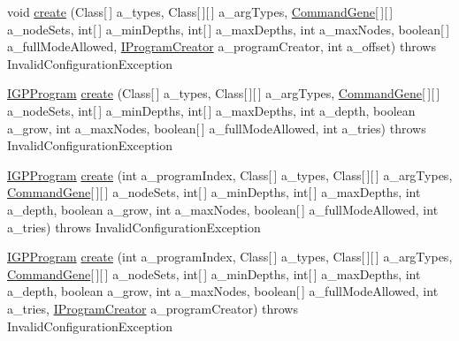 \begin{DoxyCompactItemize}
\item 
void \hyperlink{classorg_1_1jgap_1_1gp_1_1impl_1_1_g_p_population_a21670302d6d9c5ad4bdc2903797eabff}{create} (Class\mbox{[}$\,$\mbox{]} a\-\_\-types, Class\mbox{[}$\,$\mbox{]}\mbox{[}$\,$\mbox{]} a\-\_\-arg\-Types, \hyperlink{classorg_1_1jgap_1_1gp_1_1_command_gene}{Command\-Gene}\mbox{[}$\,$\mbox{]}\mbox{[}$\,$\mbox{]} a\-\_\-node\-Sets, int\mbox{[}$\,$\mbox{]} a\-\_\-min\-Depths, int\mbox{[}$\,$\mbox{]} a\-\_\-max\-Depths, int a\-\_\-max\-Nodes, boolean\mbox{[}$\,$\mbox{]} a\-\_\-full\-Mode\-Allowed, \hyperlink{interfaceorg_1_1jgap_1_1gp_1_1_i_program_creator}{I\-Program\-Creator} a\-\_\-program\-Creator, int a\-\_\-offset)  throws Invalid\-Configuration\-Exception 
\item 
\hyperlink{interfaceorg_1_1jgap_1_1gp_1_1_i_g_p_program}{I\-G\-P\-Program} \hyperlink{classorg_1_1jgap_1_1gp_1_1impl_1_1_g_p_population_a3ba57ecc975cad55e2868567baf248e9}{create} (Class\mbox{[}$\,$\mbox{]} a\-\_\-types, Class\mbox{[}$\,$\mbox{]}\mbox{[}$\,$\mbox{]} a\-\_\-arg\-Types, \hyperlink{classorg_1_1jgap_1_1gp_1_1_command_gene}{Command\-Gene}\mbox{[}$\,$\mbox{]}\mbox{[}$\,$\mbox{]} a\-\_\-node\-Sets, int\mbox{[}$\,$\mbox{]} a\-\_\-min\-Depths, int\mbox{[}$\,$\mbox{]} a\-\_\-max\-Depths, int a\-\_\-depth, boolean a\-\_\-grow, int a\-\_\-max\-Nodes, boolean\mbox{[}$\,$\mbox{]} a\-\_\-full\-Mode\-Allowed, int a\-\_\-tries)  throws Invalid\-Configuration\-Exception 
\item 
\hyperlink{interfaceorg_1_1jgap_1_1gp_1_1_i_g_p_program}{I\-G\-P\-Program} \hyperlink{classorg_1_1jgap_1_1gp_1_1impl_1_1_g_p_population_a4d68eefb94b971473cb1487ecf9f92a0}{create} (int a\-\_\-program\-Index, Class\mbox{[}$\,$\mbox{]} a\-\_\-types, Class\mbox{[}$\,$\mbox{]}\mbox{[}$\,$\mbox{]} a\-\_\-arg\-Types, \hyperlink{classorg_1_1jgap_1_1gp_1_1_command_gene}{Command\-Gene}\mbox{[}$\,$\mbox{]}\mbox{[}$\,$\mbox{]} a\-\_\-node\-Sets, int\mbox{[}$\,$\mbox{]} a\-\_\-min\-Depths, int\mbox{[}$\,$\mbox{]} a\-\_\-max\-Depths, int a\-\_\-depth, boolean a\-\_\-grow, int a\-\_\-max\-Nodes, boolean\mbox{[}$\,$\mbox{]} a\-\_\-full\-Mode\-Allowed, int a\-\_\-tries)  throws Invalid\-Configuration\-Exception 
\item 
\hyperlink{interfaceorg_1_1jgap_1_1gp_1_1_i_g_p_program}{I\-G\-P\-Program} \hyperlink{classorg_1_1jgap_1_1gp_1_1impl_1_1_g_p_population_ada6ec95d4f4e1b59e0270d6c00b92664}{create} (int a\-\_\-program\-Index, Class\mbox{[}$\,$\mbox{]} a\-\_\-types, Class\mbox{[}$\,$\mbox{]}\mbox{[}$\,$\mbox{]} a\-\_\-arg\-Types, \hyperlink{classorg_1_1jgap_1_1gp_1_1_command_gene}{Command\-Gene}\mbox{[}$\,$\mbox{]}\mbox{[}$\,$\mbox{]} a\-\_\-node\-Sets, int\mbox{[}$\,$\mbox{]} a\-\_\-min\-Depths, int\mbox{[}$\,$\mbox{]} a\-\_\-max\-Depths, int a\-\_\-depth, boolean a\-\_\-grow, int a\-\_\-max\-Nodes, boolean\mbox{[}$\,$\mbox{]} a\-\_\-full\-Mode\-Allowed, int a\-\_\-tries, \hyperlink{interfaceorg_1_1jgap_1_1gp_1_1_i_program_creator}{I\-Program\-Creator} a\-\_\-program\-Creator)  throws Invalid\-Configuration\-Exception 

\end{DoxyCompactItemize}
